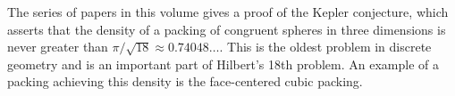 



The series of papers in this volume gives a proof of the Kepler
conjecture, which asserts that the density of a packing of congruent
spheres in three dimensions is never greater than
$\pi/\sqrt{18}\approx 0.74048\ldots$. This is the oldest problem in
discrete geometry and is an important part of Hilbert's 18th
problem. An example of a packing achieving this density is the
face-centered cubic packing.
